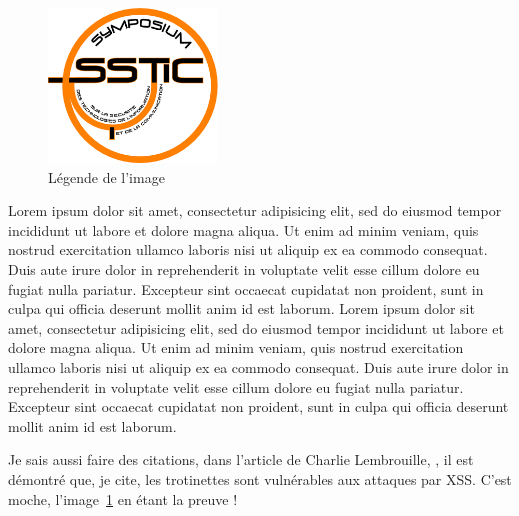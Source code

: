 \begin{figure}[ht]
  \centering
  \includegraphics[width=0.4\textwidth]{MonNom/img/archi}
  \caption{Légende de l'image}
  \label{fig:monnom:archi}
\end{figure}

Lorem ipsum dolor sit amet, consectetur adipisicing elit, sed do
eiusmod tempor incididunt ut labore et dolore magna aliqua. Ut enim ad
minim veniam, quis nostrud exercitation ullamco laboris nisi ut
aliquip ex ea commodo consequat. Duis aute irure dolor in
reprehenderit in voluptate velit esse cillum dolore eu fugiat nulla
pariatur. Excepteur sint occaecat cupidatat non proident, sunt in
culpa qui officia deserunt mollit anim id est laborum. Lorem ipsum
dolor sit amet, consectetur adipisicing elit, sed do eiusmod tempor
incididunt ut labore et dolore magna aliqua. Ut enim ad minim veniam,
quis nostrud exercitation ullamco laboris nisi ut aliquip ex ea
commodo consequat. Duis aute irure dolor in reprehenderit in voluptate
velit esse cillum dolore eu fugiat nulla pariatur. Excepteur sint
occaecat cupidatat non proident, sunt in culpa qui officia deserunt
mollit anim id est laborum.


Je sais aussi faire des citations, dans l'article de Charlie
Lembrouille, \cite{monnom:charlielembrouille}, il est démontré que, je cite,
\og{}les trotinettes sont vulnérables aux attaques par XSS\fg{}. C'est
moche, l'image~\ref{fig:monnom:archi} en étant la preuve !

